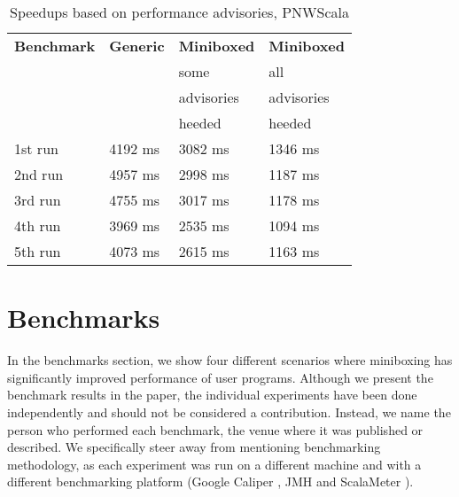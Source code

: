 \begin{table}[t]
  \centering
  \begin{tabularx}{0.48\textwidth}{|g *{3}{|Y}|} \hline
    \textbf{Benchmark} & \textbf{Generic}      & \textbf{Miniboxed}     & \textbf{Miniboxed} \\
        &                       &  some                  &  all               \\
        &                       &  advisories            &  advisories        \\
        &                       &  heeded                &  heeded            \\ \hline
    1st run            &               4192 ms &               3082 ms &             1346 ms \\
    2nd run            &               4957 ms &               2998 ms &             1187 ms \\
    3rd run            &               4755 ms &               3017 ms &             1178 ms \\
    4th run            &               3969 ms &               2535 ms &             1094 ms \\
    5th run            &               4073 ms &               2615 ms &             1163 ms \\ \hline
  \end{tabularx}
  \vspace{-2mm}
  \caption{Speedups based on performance advisories, PNWScala}
  \label{table:pureimage}
  \vspace{-1em}
\end{table}




\section{Benchmarks}
\label{sec:bench}

In the benchmarks section, we show four different scenarios where miniboxing has significantly improved performance of user programs. Although we present the benchmark results in the paper, the individual experiments have been done independently and should not be considered a contribution. Instead, we name the person who performed each benchmark, the venue where it was published or described. We specifically steer away from mentioning benchmarking methodology, as each experiment was run on a different machine and with a different benchmarking platform (Google Caliper \cite{google-caliper}, JMH \cite{jmh} and ScalaMeter \cite{scalameter}).

